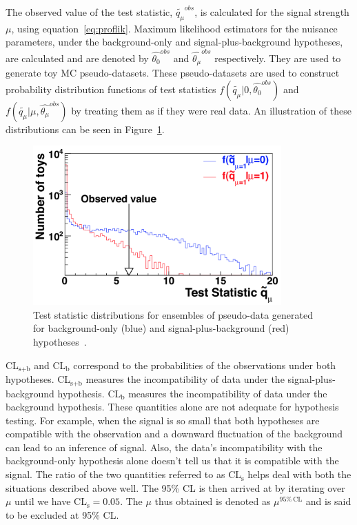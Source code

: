 The observed value of the test statistic, $\tilde{q_\mu}^{obs}$, is calculated for the signal strength $\mu$, using equation~\ref{eq:proflik}. Maximum likelihood estimators for the nuisance parameters, under the background-only and signal-plus-background hypotheses, are calculated and are denoted by $\hat{\theta_{0}}^{obs}$ and $\hat{\theta_\mu}^{obs}$ respectively. They are used to generate toy MC pseudo-datasets. These pseudo-datasets are used to construct probability distribution functions of test statistics $f(\tilde{q_\mu}|0,\hat{\theta_{0}}^{obs})$ and $f(\tilde{q_\mu}|\mu,\hat{\theta_\mu}^{obs})$ by treating them as if they were real data. An illustration of these distributions can be seen in Figure~\ref{fig:test_stat_dist}.
\begin{figure}[!htpb]\centering
 \captionsetup{width=.87\textwidth,justification=centering}
 \includegraphics[width=0.85\textwidth]{plots/chapter8/test_statistic_distri.png}
 \caption{Test statistic distributions for ensembles of pseudo-data generated for background-only (blue) and signal-plus-background (red) hypotheses~\cite{ATLAS:2011tau}.}
 \label{fig:test_stat_dist}
\end{figure}

CL$_\text{s+b}$ and CL$_\text{b}$ correspond to the probabilities of the observations under both hypotheses. CL$_\text{s+b}$ measures the incompatibility of data under the signal-plus-background hypothesis. CL$_\text{b}$ measures the incompatibility of data under the background hypothesis. These quantities alone are not adequate for hypothesis testing. For example, when the signal is so small that both hypotheses are compatible with the observation and a downward fluctuation of the background can lead to an inference of signal. Also, the data's incompatibility with the background-only hypothesis alone doesn't tell us that it is compatible with the signal. The ratio of the two quantities referred to as CL$_\text{s}$ helps deal with both the situations described above well. The 95\% CL is then arrived at by iterating over $\mu$ until we have CL$_\text{s}=0.05$. The $\mu$ thus obtained is denoted as $\mu^{95\% \, \text{CL}}$ and is said to be excluded at 95\% CL.

